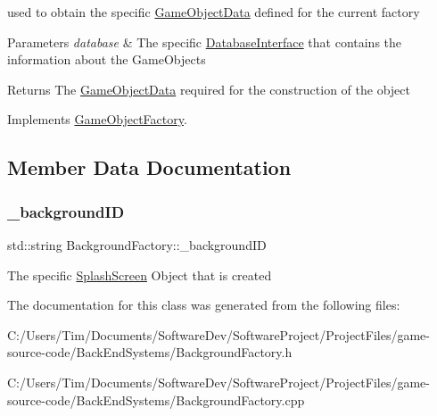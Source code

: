 used to obtain the specific \hyperlink{struct_game_object_data}{Game\+Object\+Data} defined for the current factory 


\begin{DoxyParams}{Parameters}
{\em database} & The specific \hyperlink{class_database_interface}{Database\+Interface} that contains the information about the Game\+Objects \\
\hline
\end{DoxyParams}
\begin{DoxyReturn}{Returns}
The \hyperlink{struct_game_object_data}{Game\+Object\+Data} required for the construction of the object 
\end{DoxyReturn}


Implements \hyperlink{class_game_object_factory_ae9358fbb3ef2d3b127320341760d3ff9}{Game\+Object\+Factory}.



\subsection{Member Data Documentation}
\mbox{\label{class_background_factory_a88dfa3ed001d4975bc8a76f5603d5017}} 
\subsubsection{\texorpdfstring{\+\_\+background\+ID}{\_backgroundID}}
{\footnotesize\ttfamily std\+::string Background\+Factory\+::\+\_\+background\+ID\hspace{0.3cm}{\ttfamily [private]}}

The specific \hyperlink{class_splash_screen}{Splash\+Screen} Object that is created 

The documentation for this class was generated from the following files\+:\begin{DoxyCompactItemize}
\item 
C\+:/\+Users/\+Tim/\+Documents/\+Software\+Dev/\+Software\+Project/\+Project\+Files/game-\/source-\/code/\+Back\+End\+Systems/Background\+Factory.\+h\item 
C\+:/\+Users/\+Tim/\+Documents/\+Software\+Dev/\+Software\+Project/\+Project\+Files/game-\/source-\/code/\+Back\+End\+Systems/Background\+Factory.\+cpp\end{DoxyCompactItemize}
